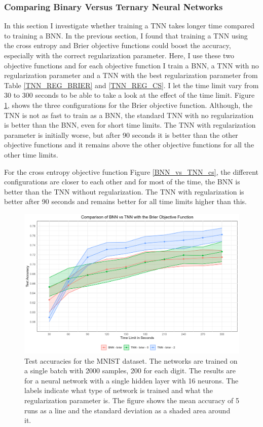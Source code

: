 




\subsubsection{Comparing Binary Versus Ternary Neural Networks}
\noindent In this section I investigate whether training a TNN takes longer time compared to training a BNN. In the previous section, I found that training a TNN using the cross entropy and Brier objective functions could boost the accuracy, especially with the correct regularization parameter. Here, I use these two objective functions and for each objective function I train a BNN, a TNN with no regularization parameter and a TNN with the best regularization parameter from Table \ref{TNN_REG_BRIER} and \ref{TNN_REG_CS}. I let the time limit vary from 30 to 300 seconds to be able to take a look at the effect of the time limit. Figure \ref{BNN_vs_TNN_brier}, shows the three configurations for the Brier objective function. Although, the TNN is not as fast to train as a BNN, the standard TNN with no regularization is better than the BNN, even for short time limits. The TNN with regularization parameter is initially worse, but after 90 seconds it is better than the other objective functions and it remains above the other objective functions for all the other time limits.

\noindent For the cross entropy objective function Figure \ref{BNN_vs_TNN_cs}, the different configurations are closer to each other and for most of the time, the BNN is better than the TNN without regularization. The TNN with regularization is better after 90 seconds and remains better for all time limits higher than this. 


\begin{figure}[H]
    \centering
    \includegraphics[width=1\linewidth]{Figures/BNN_vs_TNN_brier.png}
    \caption{Test accuracies for the MNIST dataset. The networks are trained on a single batch with 2000 samples, 200 for each digit. The results are for a neural network with a single hidden layer with 16 neurons. The labels indicate what type of network is trained and what the regularization parameter is. The figure shows the mean accuracy of 5 runs as a line and the standard deviation as a shaded area around it.}
    \label{BNN_vs_TNN_brier}
\end{figure}

